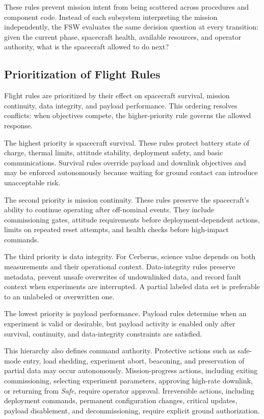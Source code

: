 \documentclass[10pt,letterpaper,twoside,fleqn]{article}
\newcommand{\Indent}{\hspace*{4\fontdimen2\font}}
\begin{document}
These rules prevent mission intent from being scattered across procedures and component code. Instead of each subsystem interpreting the mission independently, the FSW evaluates the same decision question at every transition: given the current phase, spacecraft health, available resources, and operator authority, what is the spacecraft allowed to do next?

\subsection{Prioritization of Flight Rules}

\Indent
Flight rules are prioritized by their effect on spacecraft survival, mission continuity, data integrity, and payload performance. This ordering resolves conflicts: when objectives compete, the higher-priority rule governs the allowed response.

The highest priority is spacecraft survival. These rules protect battery state of charge, thermal limits, attitude stability, deployment safety, and basic communications. Survival rules override payload and downlink objectives and may be enforced autonomously because waiting for ground contact can introduce unacceptable risk.

The second priority is mission continuity. These rules preserve the spacecraft's ability to continue operating after off-nominal events. They include commissioning gates, attitude requirements before deployment-dependent actions, limits on repeated reset attempts, and health checks before high-impact commands.

The third priority is data integrity. For Cerberus, science value depends on both measurements and their operational context. Data-integrity rules preserve metadata, prevent unsafe overwrites of undownlinked data, and record fault context when experiments are interrupted. A partial labeled data set is preferable to an unlabeled or overwritten one.

The lowest priority is payload performance. Payload rules determine when an experiment is valid or desirable, but payload activity is enabled only after survival, continuity, and data-integrity constraints are satisfied.

This hierarchy also defines command authority. Protective actions such as safe-mode entry, load shedding, experiment abort, beaconing, and preservation of partial data may occur autonomously. Mission-progress actions, including exiting commissioning, selecting experiment parameters, approving high-rate downlink, or returning from \textit{Safe}, require operator approval. Irreversible actions, including deployment commands, permanent configuration changes, critical updates, payload disablement, and decommissioning, require explicit ground authorization.
\end{document}
